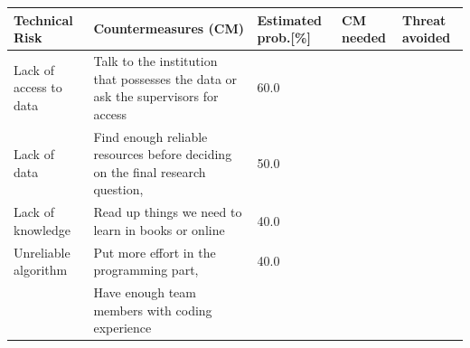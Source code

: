 \def\checkmark{\tikz\fill[scale=0.4](0,.35) -- (.25,0) -- (1,.7) -- (.25,.15) -- cycle;}
\begin{center}
	\begin{footnotesize}
		\setlength{\arrayrulewidth}{1,05pt}
		\begin{tabular}[htb]{|p{2cm}|p{5cm}|p{1.5cm}|p{1cm}|p{1cm}|}
			\hline
			\textbf{Technical Risk} & \textbf{Countermeasures (CM)} &
			\textbf{Estimated prob.[\%]} &\textbf{CM needed} & \textbf{Threat avoided} \\
			\hline
			\hline
			\rowcolor{lightgray} Lack of access to data & Talk to the institution that possesses the data or ask the supervisors for access & 60.0 & \cmark & \cmark\\
			\hline	
			\rowcolor{lightgray} Lack of data & Find enough reliable resources before deciding on the final research question, & 50.0& \cmark & \cmark\\
			\hline
			\rowcolor{lightergray} Lack of knowledge & Read up things we need to learn in books or online & 40.0& \xmark & \cmark\\
			\hline
			\rowcolor{lightergray} Unreliable algorithm & Put more effort in the programming part, & 40.0&  \cmark& \cmark\\
			\rowcolor{lightergray} & Have enough team members with coding experience & &\xmark &\cmark\\
			

\end{tabular}
\end{footnotesize}
\end{center}
